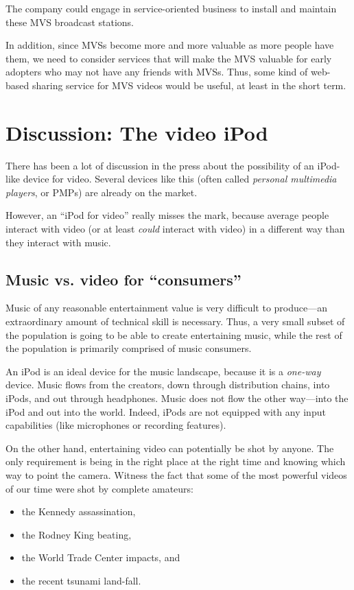 \documentclass[12pt]{article}
\begin{document}
The company could engage in service-oriented business to install and maintain these MVS broadcast stations. 

In addition, since MVSs become more and more valuable as more people have them, we need to consider services that will make the MVS valuable for early adopters who may not have any friends with MVSs.
Thus, some kind of web-based sharing service for MVS videos would be useful, at least in the short term.

\appendix
\section{Discussion:  The video iPod}
\label{sec:iPod}
There has been a lot of discussion in the press about the possibility of an iPod-like device for video.
Several devices like this (often called {\it personal multimedia players}, or PMPs) are already on the market.

However, an ``iPod for video'' really misses the mark, because average people interact with video (or at least {\it could} interact with video) in a different way than they interact with music.

\subsection{Music vs. video for ``consumers''}

Music of any reasonable entertainment value is very difficult to produce---an extraordinary amount of technical skill is necessary.
Thus, a very small subset of the population is going to be able to create entertaining music, while the rest of the population is primarily comprised of music consumers.

An iPod is an ideal device for the music landscape, because it is a {\it one-way} device.
Music flows from the creators, down through distribution chains, into iPods, and out through headphones.
Music does not flow the other way---into the iPod and out into the world.
Indeed, iPods are not equipped with any input capabilities (like microphones or recording features).

On the other hand, entertaining video can potentially be shot by anyone.
The only requirement is being in the right place at the right time and knowing which way to point the camera.
Witness the fact that some of the most powerful videos of our time were shot by complete amateurs:
\begin{itemize}
\item the Kennedy assassination, 
\item the Rodney King beating, 
\item the World Trade Center impacts, and
\item the recent tsunami land-fall.
\end{itemize}
\end{document}
